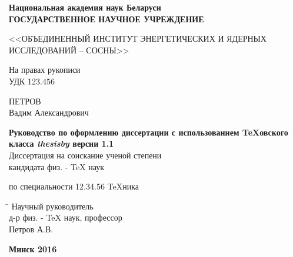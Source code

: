 \begin{titlepage}

\begin{center} \bfseries
 Национальная академия наук Беларуси \\
\bigskip
{ГОСУДАРСТВЕННОЕ НАУЧНОЕ УЧРЕЖДЕНИЕ}
\medskip

{<<ОБЪЕДИНЕННЫЙ ИНСТИТУТ ЭНЕРГЕТИЧЕСКИХ
И ЯДЕРНЫХ ИССЛЕДОВАНИЙ – СОСНЫ>>}
\end{center}
\medskip

\noindent На правах рукописи\\
УДК  123.456 \\
\vspace{1cm}

\begin{center}
{\large ПЕТРОВ \\ Вадим Александрович}\\ \vspace{1cm}

{\bfseries Руководство по оформлению диссертации с использованием \TeX овского класса {\itshape thesisby} версии 1.1}\\
\vspace{2cm}
Диссертация на соискание ученой степени\\
кандидата физ. - \TeX{} наук\\
\medskip

по специальности 12.34.56 \TeX ника
\end{center}
\vspace{3cm}

\begin{tabbing}
\hspace{8cm} \= \kill \>
Научный руководитель \+ \\
д-р физ. - \TeX{} наук, профессор\\
Петров А.В.
\end{tabbing}
\vspace{5cm}

\begin{center}
 \bfseries Минск 2016
\end{center}

\end{titlepage}
